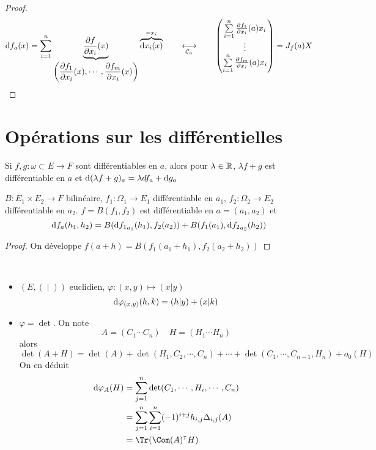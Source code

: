 \begin{proof}
    \[
        \mathrm{d} f_a(x)=\sum_{i=1}^n\underbrace{\frac{\partial f}{\partial x_i}(x)}_{\displaystyle \left(\frac{\partial f_1}{\partial x_i}(x), \cdots, \frac{\partial f_m}{\partial x_i}(x)\right)}\overbrace{\mathrm{d} x_i(x)}^{=x_i} \qquad \underset{\mathcal C_n}{\longleftrightarrow}\qquad \begin{pmatrix}
            \sum_{i=1}^n\limits \frac{\partial f_1}{\partial x_i}(a)x_i \\
            \vdots \\
            \sum_{i=1}^n\limits \frac{\partial f_m}{\partial x_i}(a)x_i
        \end{pmatrix}=J_f(a)X
    \]
\end{proof}

\section{Opérations sur les différentielles}

\begin{prop}
    Si $f,g:\omega\subset E\to F$ sont différentiables en $a$, alors pour $\lambda\in\mathbb R$, $\lambda f+g$ est différentiable en $a$ et $\mathrm{d} (\lambda f+g)_a=\lambda df_a+\mathrm{d} g_a$ 
\end{prop}

\begin{prop}
    \Hyp $B:E_1\times E_2\to F$ bilinéaire, $f_1:\Omega_1\to E_1$ différentiable en $a_1$, $f_2:\Omega_2\to E_2$ différentiable en $a_2$.
    \Conc $f=B(f_1, f_2)$ est différentiable en $a=(a_1, a_2)$ et \[\mathrm{d} f_a(h_1, h_2)=B(\mathrm{d} {f_1}_{a_1}(h_1), f_2(a_2))+B(f_1(a_1), \mathrm{d} {f_2}_{a_2}(h_2)) \]
\end{prop}

\begin{proof}
    On développe $f(a+h)=B(f_1(a_1+h_1), f_2(a_2+h_2))$
\end{proof}

\begin{ex} ~
    \begin{itemize}
        \item $(E, (\; |\; ))$ euclidien, $\varphi:(x, y)\longmapsto (x|y)$ \[
                \mathrm{d} \varphi_{(x, y)}(h, k)=(h|y)+(x|k)
            \]
        \item $\varphi = \det $. On note \[
                A = (C_1 \cdots C_n) \quad H=(H_1 \cdots H_n)
            \]
            alors \[
                \det(A+H)=\det(A)+\det(H_1, C_2, \cdots, C_n)+\cdots + \det(C_1, \cdots, C_{n-1}, H_n)+o_0(H)
            \]
            On en déduit \begin{align*}
                \diff \varphi_A(H) &= \sum_{j=1}^n \det(C_1, \cdots, H_i, \cdots, C_n)\\
                                   &= \sum_{j=1}^n\sum_{i=1}^n(-1)^{i+j}h_{i, j}\Delta_{i, j}(A) \\
                                   &= \Tr(\Com(A)^\intercal H)
            \end{align*}
    \end{itemize}
\end{ex}

